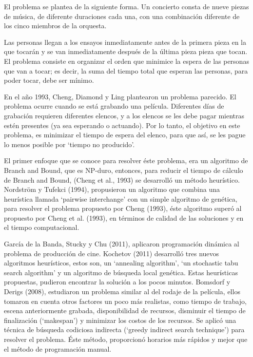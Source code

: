 \documentclass[journal, 10pt]{IEEEtran}
\begin{document}
El problema se plantea de la siguiente forma. Un concierto consta de nueve piezas de música, de diferente duraciones cada una, con una combinación diferente de los cinco miembros de la orquesta.

Las personas llegan a los ensayos inmediatamente antes de la primera pieza en la que tocarán y se van inmediatamente después de la última pieza pieza que tocan. El problema consiste en organizar el orden que minimice la espera de las personas que van a tocar; es decir, la suma del tiempo total que esperan las personas, para poder tocar, debe ser mínimo.

En el año 1993, Cheng, Diamond y Ling\cite{ref1} plantearon un problema parecido. El problema ocurre cuando se está grabando una película. Diferentes días de grabación requieren diferentes elencos, y a los elencos se les debe pagar mientras estén presentes (ya sea esperando o actuando). Por lo tanto, el objetivo en este problema, es minimizar el tiempo de espera del elenco, para que así, se les pague lo menos posible por `tiempo no producido'.

El primer enfoque que se conoce para resolver éste problema, era un algoritmo de Branch and Bound, que es NP-duro, entonces, para reducir el tiempo de cálculo de Branch and Bound, (Cheng et al., 1993) se desarrolló un método heurístico\cite{ref1}. Nordström y Tufekci (1994)\cite{ref2}, propusieron un algoritmo que combina una heurística llamada `pairwise interchange' con un simple algoritmo de genética, para resolver el problema propuesto por Cheng (1993)\cite{ref1}, éste algoritmo superó al propuesto por Cheng et al. (1993)\cite{ref1}, en términos de calidad de las soluciones y en el tiempo computacional.

García de la Banda, Stucky y Chu (2011)\cite{ref3}, aplicaron programación dinámica al problema de producción de cine. Kochetov (2011)\cite{ref4} desarrolló tres nuevos algoritmos heurísticos, estos son, un `annealing algorithm', `un stochastic tabu search algorithm' y un algoritmo de búsqueda local genética. Estas heurísticas propuestas, pudieron encontrar la solución a los pocos minutos. Bomsdorf y Derigs (2008)\cite{ref5}, estudiaron un problema similar al del rodaje de la película, ellos tomaron en cuenta otros factores un poco más realistas, como tiempo de trabajo, escena anteriormente grabada, disponibilidad de recursos, disminuir el tiempo de finalización (`makespan') y minimizar los costos de los recursos. Se aplicó una técnica de búsqueda codiciosa indirecta (`greedy indirect search technique') para resolver el problema. Éste método, proporcionó horarios más rápidos y mejor que el método de programación manual.
\end{document}
